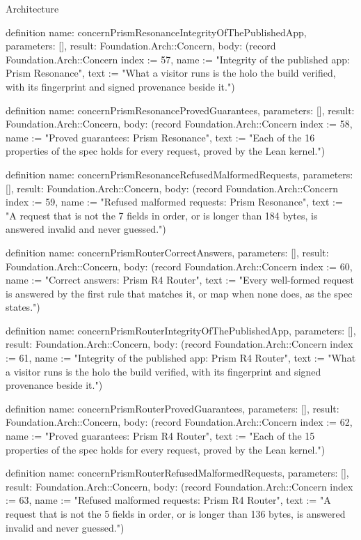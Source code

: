 \begin{lexlean}{Architecture}
\begin{semanticmodule}
definition{
  name: concernPrismResonanceIntegrityOfThePublishedApp,
  parameters: [],
  result: Foundation.Arch::Concern,
  body: (record Foundation.Arch::Concern {index := 57, name := "Integrity of the published app: Prism Resonance", text := "What a visitor runs is the holo the build verified, with its fingerprint and signed provenance beside it."})
}

definition{
  name: concernPrismResonanceProvedGuarantees,
  parameters: [],
  result: Foundation.Arch::Concern,
  body: (record Foundation.Arch::Concern {index := 58, name := "Proved guarantees: Prism Resonance", text := "Each of the 16 properties of the spec holds for every request, proved by the Lean kernel."})
}

definition{
  name: concernPrismResonanceRefusedMalformedRequests,
  parameters: [],
  result: Foundation.Arch::Concern,
  body: (record Foundation.Arch::Concern {index := 59, name := "Refused malformed requests: Prism Resonance", text := "A request that is not the 7 fields in order, or is longer than 184 bytes, is answered invalid and never guessed."})
}

definition{
  name: concernPrismRouterCorrectAnswers,
  parameters: [],
  result: Foundation.Arch::Concern,
  body: (record Foundation.Arch::Concern {index := 60, name := "Correct answers: Prism R4 Router", text := "Every well-formed request is answered by the first rule that matches it, or map when none does, as the spec states."})
}

definition{
  name: concernPrismRouterIntegrityOfThePublishedApp,
  parameters: [],
  result: Foundation.Arch::Concern,
  body: (record Foundation.Arch::Concern {index := 61, name := "Integrity of the published app: Prism R4 Router", text := "What a visitor runs is the holo the build verified, with its fingerprint and signed provenance beside it."})
}

definition{
  name: concernPrismRouterProvedGuarantees,
  parameters: [],
  result: Foundation.Arch::Concern,
  body: (record Foundation.Arch::Concern {index := 62, name := "Proved guarantees: Prism R4 Router", text := "Each of the 15 properties of the spec holds for every request, proved by the Lean kernel."})
}

definition{
  name: concernPrismRouterRefusedMalformedRequests,
  parameters: [],
  result: Foundation.Arch::Concern,
  body: (record Foundation.Arch::Concern {index := 63, name := "Refused malformed requests: Prism R4 Router", text := "A request that is not the 5 fields in order, or is longer than 136 bytes, is answered invalid and never guessed."})
}


\end{semanticmodule}
\end{lexlean}
